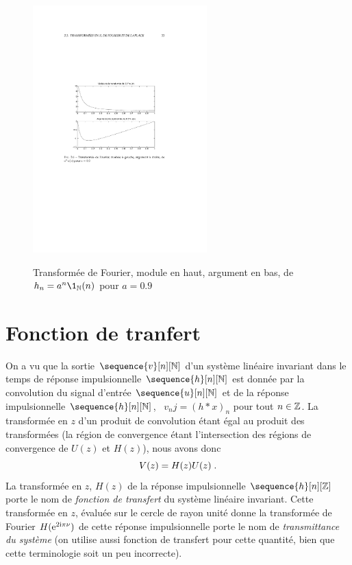 \begin{figure}
  \centering
  \includegraphics[width=0.6\textwidth]{Figures/FigMignotte-2}\\
  \caption{Transform\'{e}e de Fourier, module en haut, argument en bas, de $h_n= a^n \1_\nset(n)$ pour $a=0.9$
}\label{fig:FigMignotte-2}
\end{figure}
\section{Fonction de tranfert}
On a vu que la sortie $\sequence{v}[n][\nset]$ d'un système linéaire invariant dans le temps de r\'{e}ponse impulsionnelle $\sequence{h}[n][\nset]$ est donn\'{e}e par la convolution du signal d'entr\'{e}e $\sequence{u}[n][\nset]$ et de la réponse impulsionnelle $\sequence{h}[n][\nset]$, \ie\ 
$v_nj = (h * x)_n$ pour tout $n \in \mathbb{Z}$. La transformée en $z$ d'un produit de convolution étant égal au produit des transformées (la région de convergence étant l'intersection des régions de convergence de $U(z)$ et $H(z)$), nous avons donc
$$
V(z)=H(z)U(z) \;.
$$
La transform\'{e}e en $z$, $H(z)$  de la r\'{e}ponse impulsionnelle $\sequence{h}[n][\zset]$ porte le nom de \emph{fonction de transfert} du syst\`{e}me lin\'{e}aire invariant. Cette transform\'{e}e en $z$, \'{e}valu\'{e}e sur le cercle de rayon unit\'{e} donne la transform\'{e}e de Fourier $H(\mathrm{e}^{2 \mathrm{i} \pi \nu})$ de cette r\'{e}ponse impulsionnelle porte le nom de \emph{transmittance du syst\`{e}me} (on utilise aussi 
fonction de transfert pour cette quantité, bien que cette terminologie soit un peu incorrecte).

